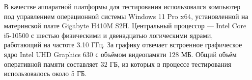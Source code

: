 В качестве аппаратной платформы для тестирования использовался компьютер под управлением операционной системы Windows 11 Pro x64, установленной на материнской плате Gigabyte H410M S2H. Центральный процессор --- Intel Core i5-10500 с шестью физическими и двенадцатью логическими ядрами, работающий на частоте 3.10 ГГц. За графику отвечает встроенное графическое ядро Intel UHD Graphics 630 с объёмом видеопамяти 128 МБ. Общий объём оперативной памяти составляет 32 ГБ, из которых в процессе тестирования использовалось около 5 ГБ.
